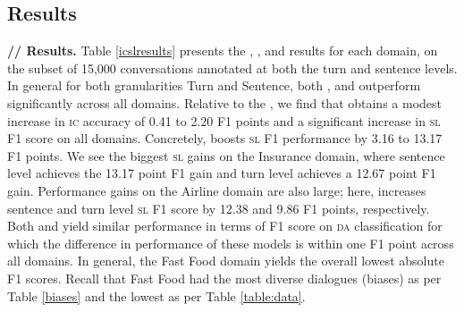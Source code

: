 \subsection{Results}
\textbf{// Results.} Table \ref{icslresults} presents the , \lstm{}, and \elmo{} results for each domain, on the subset of 15,000 conversations annotated at both the turn and sentence levels. In general for both granularities Turn and Sentence, both \lstm{}, and \elmo{} outperform  significantly across all domains.  %
Relative to the \lstm, we find that \elmo{} obtains a modest increase in \textsc{ic} accuracy of 0.41 to 2.20 F1 points and a significant increase in \textsc{sl} F1 score on all domains. Concretely, \elmo{} boosts \textsc{sl} F1 performance by 3.16 to 13.17 F1 points. We see the biggest \textsc{sl} gains on the Insurance domain, where sentence level \elmo{} achieves the 13.17 point F1 gain and turn level \elmo{} achieves a 12.67 point F1 gain. Performance gains on the Airline domain are also large; here, \elmo{} increases sentence and turn level \textsc{sl} F1 score by 12.38 and 9.86 F1 points, respectively. 
Both \lstm{} and \elmo{} yield similar performance in terms of F1 score on \textsc{da} classification for which the difference in performance of these models is within one F1 point across all domains. In general, the Fast Food domain yields the overall lowest absolute F1 scores. Recall that Fast Food had the most diverse dialogues (biases) as per Table \ref{biases} and the lowest  as per Table \ref{table:data}.

